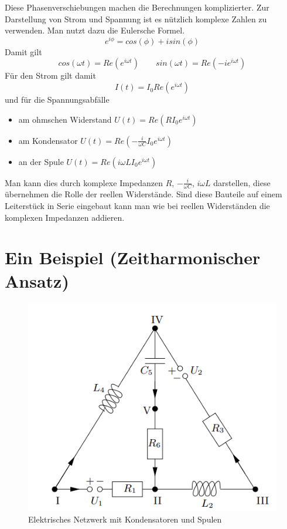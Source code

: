 \documentclass[11pt,titlepage]{article}
\begin{document}
		Diese Phasenverschiebungen machen die Berechnungen komplizierter. Zur Darstellung von Strom und Spannung ist es nützlich komplexe Zahlen zu verwenden. Man nutzt dazu die Eulersche Formel.
		\begin{displaymath}
			e^{i \phi} = cos(\phi ) +i sin(\phi)
		\end{displaymath}
		Damit gilt
		\begin{displaymath}
			cos(\omega t) = Re(e^{i \omega t}) \qquad sin(\omega t) = Re(-i e^{i \omega t})
		\end{displaymath}
		Für den Strom gilt damit
		\begin{displaymath}
			I(t) = I_0 Re(e^{i \omega t})
		\end{displaymath}
		und für die Spannungsabfälle
		\begin{itemize}
			\item am ohmschen Widerstand $U(t) = Re(R I_0 e^{i \omega t})$
			\item am Kondensator $U(t) = Re(- \frac{i}{\omega C} I_0 e^{i \omega t})$
			\item an der Spule $U(t) = Re(i \omega L I_0 e^{i \omega t})$
		\end{itemize}
		Man kann dies durch komplexe Impedanzen $R$, $-\frac{i}{\omega C}$, $i \omega L$ darstellen, diese übernehmen die Rolle der reellen Widerstände. Sind diese Bauteile auf einem Leiterstück \grqq in Serie \glqq{} eingebaut kann man wie bei reellen Widerständen die komplexen Impedanzen addieren.
	
	\newpage
	\section{Ein Beispiel (Zeitharmonischer Ansatz)}
		
		\begin{figure}[H]
			\centering
			\includegraphics[scale=0.7]{Photos/Beispiel}
			\caption{Elektrisches Netzwerk mit Kondensatoren und Spulen}
		\end{figure}
				
\end{document}
